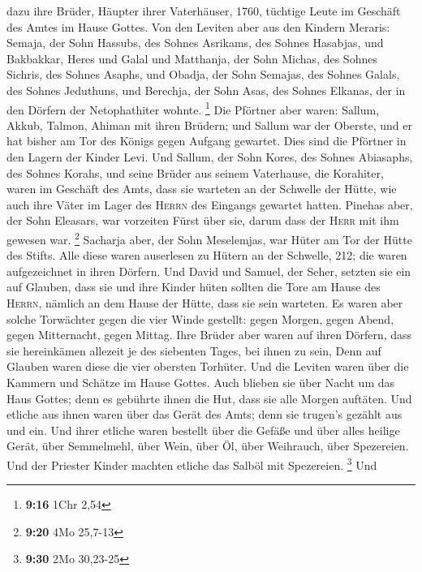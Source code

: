  dazu ihre Brüder, Häupter ihrer Vaterhäuser, 1760,
tüchtige Leute im Geschäft des Amtes im Hause Gottes. 
Von den Leviten aber aus den Kindern Meraris: Semaja, der Sohn Hassubs,
des Sohnes Asrikams, des Sohnes Hasabjas,  und Bakbakkar,
Heres und Galal und Matthanja, der Sohn Michas, des Sohnes Sichris, des
Sohnes Asaphs,  und Obadja, der Sohn Semajas, des Sohnes
Galals, des Sohnes Jeduthuns, und Berechja, der Sohn Asas, des Sohnes
Elkanas, der in den Dörfern der Netophathiter wohnte. \footnote{\textbf{9:16}
  1Chr 2,54}  Die Pförtner aber waren: Sallum, Akkub,
Talmon, Ahiman mit ihren Brüdern; und Sallum war der Oberste,
 und er hat bisher am Tor des Königs gegen Aufgang
gewartet. Dies sind die Pförtner in den Lagern der Kinder Levi.
 Und Sallum, der Sohn Kores, des Sohnes Abiasaphs, des
Sohnes Korahs, und seine Brüder aus seinem Vaterhause, die Korahiter,
waren im Geschäft des Amts, dass sie warteten an der Schwelle der Hütte,
wie auch ihre Väter im Lager des \textsc{Herrn} des Eingangs gewartet
hatten.  Pinehas aber, der Sohn Eleasars, war vorzeiten
Fürst über sie, darum dass der \textsc{Herr} mit ihm gewesen war.
\footnote{\textbf{9:20} 4Mo 25,7-13}  Sacharja aber, der
Sohn Meselemjas, war Hüter am Tor der Hütte des Stifts. 
Alle diese waren auserlesen zu Hütern an der Schwelle, 212; die waren
aufgezeichnet in ihren Dörfern. Und David und Samuel, der Seher, setzten
sie ein auf Glauben,  dass sie und ihre Kinder hüten
sollten die Tore am Hause des \textsc{Herrn}, nämlich an dem Hause der
Hütte, dass sie sein warteten.  Es waren aber solche
Torwächter gegen die vier Winde gestellt: gegen Morgen, gegen Abend,
gegen Mitternacht, gegen Mittag.  Ihre Brüder aber waren
auf ihren Dörfern, dass sie hereinkämen allezeit je des siebenten Tages,
bei ihnen zu sein,  Denn auf Glauben waren diese die vier
obersten Torhüter. Und die Leviten waren über die Kammern und Schätze im
Hause Gottes.  Auch blieben sie über Nacht um das Haus
Gottes; denn es gebührte ihnen die Hut, dass sie alle Morgen auftäten.
 Und etliche aus ihnen waren über das Gerät des Amts;
denn sie trugen's gezählt aus und ein.  Und ihrer etliche
waren bestellt über die Gefäße und über alles heilige Gerät, über
Semmelmehl, über Wein, über Öl, über Weihrauch, über Spezereien.
 Und der Priester Kinder machten etliche das Salböl mit
Spezereien. \footnote{\textbf{9:30} 2Mo 30,23-25}  Und
